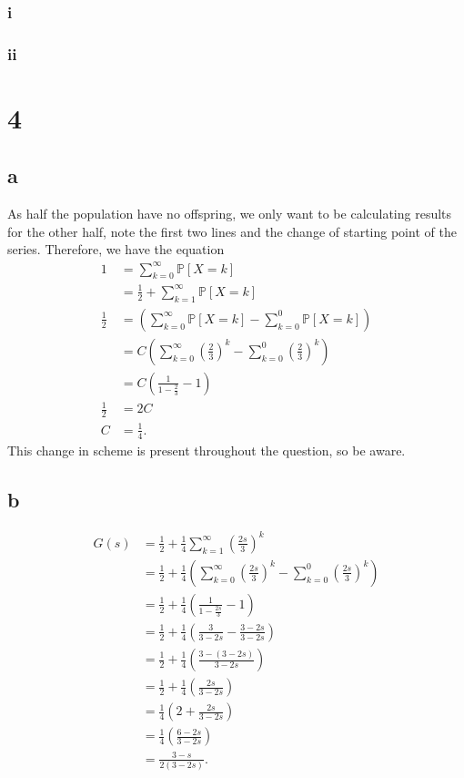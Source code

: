 \documentclass{article}
\newcommand{\Prob}{\mathbb{P}}
\begin{document}
\subsubsection{i}


\subsubsection{ii}

\section{4}
\subsection{a}
As half the population have no offspring, we only want to be calculating results for the other half, note the first two lines and the change of starting point of the series. Therefore, we have the equation
\begin{align}
    1 &= \sum_{k=0}^\infty \Prob[X=k]\\
    &= \frac{1}{2} + \sum_{k=1}^\infty \Prob[X=k] \\
    \frac{1}{2} &= \left( \sum_{k=0}^\infty \Prob[X=k] - \sum_{k=0}^0 \Prob[X=k]\right) \\
    &= C\left( \sum_{k=0}^\infty \left(\frac{2}{3}\right)^k - \sum_{k=0}^0 \left(\frac{2}{3}\right)^k \right) \\
    &= C\left( \frac{1}{1-\frac{2}{3}} - 1 \right) \\
    \frac{1}{2}&= 2C \\
    C &= \frac{1}{4}.
\end{align}
This change in scheme is present throughout the question, so be aware.

\subsection{b}
\begin{align}
    G(s) &= \frac{1}{2} + \frac{1}{4}\sum_{k=1}^\infty \left( \frac{2s}{3} \right)^k \\
    &= \frac{1}{2} + \frac{1}{4}\left( \sum_{k=0}^\infty \left( \frac{2s}{3} \right)^k - \sum_{k=0}^0 \left( \frac{2s}{3} \right)^k\right) \\
    &= \frac{1}{2} + \frac{1}{4}\left( \frac{1}{1-\frac{2s}{3}} - 1 \right) \\
    &= \frac{1}{2} + \frac{1}{4}\left( \frac{3}{3-2s} - \frac{3-2s}{3-2s} \right) \\
    &= \frac{1}{2} + \frac{1}{4}\left( \frac{3-(3-2s)}{3-2s}  \right) \\
    &= \frac{1}{2} + \frac{1}{4}\left( \frac{2s}{3-2s}  \right) \\
    &= \frac{1}{4}\left( 2 + \frac{2s}{3-2s} \right) \\
    &= \frac{1}{4}\left(\frac{6-2s}{3-2s} \right) \\
    &= \frac{3-s}{2(3-2s)}.
\end{align}
\end{document}

